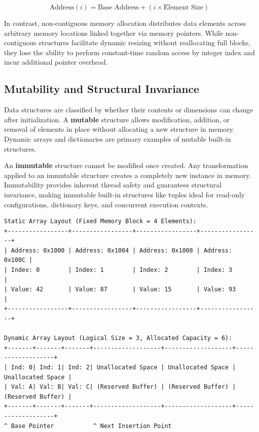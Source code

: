 \documentclass[12pt]{report}
\begin{document}
\begin{equation}
\text{Address}(i) = \text{Base Address} + (i \times \text{Element Size})
\end{equation}

In contrast, non-contiguous memory allocation distributes data elements across arbitrary memory locations linked together via memory pointers. While non-contiguous structures facilitate dynamic resizing without reallocating full blocks, they lose the ability to perform constant-time random access by integer index and incur additional pointer overhead.

\subsection{Mutability and Structural Invariance}

Data structures are classified by whether their contents or dimensions can change after initialization. A \textbf{mutable} structure allows modification, addition, or removal of elements in place without allocating a new structure in memory. Dynamic arrays and dictionaries are primary examples of mutable built-in structures.

An \textbf{immutable} structure cannot be modified once created. Any transformation applied to an immutable structure creates a completely new instance in memory. Immutability provides inherent thread safety and guarantees structural invariance, making immutable built-in structures like tuples ideal for read-only configurations, dictionary keys, and concurrent execution contexts.

\begin{verbatim}
Static Array Layout (Fixed Memory Block = 4 Elements):
+-----------------+-----------------+-----------------+-----------------+
| Address: 0x1000 | Address: 0x1004 | Address: 0x1008 | Address: 0x100C |
| Index: 0        | Index: 1        | Index: 2        | Index: 3        |
| Value: 42       | Value: 87       | Value: 15       | Value: 93       |
+-----------------+-----------------+-----------------+-----------------+

Dynamic Array Layout (Logical Size = 3, Allocated Capacity = 6):
+-------+-------+-------+-------------------+-------------------+-------------------+
| Ind: 0| Ind: 1| Ind: 2| Unallocated Space | Unallocated Space | Unallocated Space |
| Val: A| Val: B| Val: C| (Reserved Buffer) | (Reserved Buffer) | (Reserved Buffer) |
+-------+-------+-------+-------------------+-------------------+-------------------+
^ Base Pointer           ^ Next Insertion Point
\end{verbatim}
\end{document}
